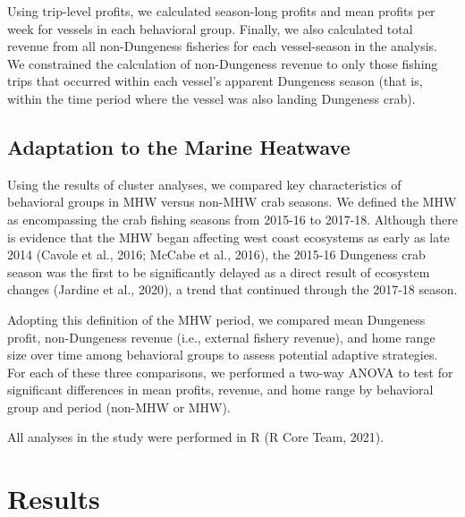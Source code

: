 \documentclass[]{elsarticle} %
\begin{document}
Using trip-level profits, we calculated season-long profits and mean
profits per week for vessels in each behavioral group. Finally, we also
calculated total revenue from all non-Dungeness fisheries for each
vessel-season in the analysis. We constrained the calculation of
non-Dungeness revenue to only those fishing trips that occurred within
each vessel's apparent Dungeness season (that is, within the time period
where the vessel was also landing Dungeness crab).

\hypertarget{adaptation-to-the-marine-heatwave}{%
\subsection{Adaptation to the Marine
Heatwave}\label{adaptation-to-the-marine-heatwave}}

Using the results of cluster analyses, we compared key characteristics
of behavioral groups in MHW versus non-MHW crab seasons. We defined the
MHW as encompassing the crab fishing seasons from 2015-16 to 2017-18.
Although there is evidence that the MHW began affecting west coast
ecosystems as early as late 2014 (Cavole et al., 2016; McCabe et al.,
2016), the 2015-16 Dungeness crab season was the first to be
significantly delayed as a direct result of ecosystem changes (Jardine
et al., 2020), a trend that continued through the 2017-18 season.

Adopting this definition of the MHW period, we compared mean Dungeness
profit, non-Dungeness revenue (i.e., external fishery revenue), and home
range size over time among behavioral groups to assess potential
adaptive strategies. For each of these three comparisons, we performed a
two-way ANOVA to test for significant differences in mean profits,
revenue, and home range by behavioral group and period (non-MHW or MHW).

All analyses in the study were performed in R (R Core Team, 2021).

\hypertarget{results}{%
\section{Results}\label{results}}
\end{document}
